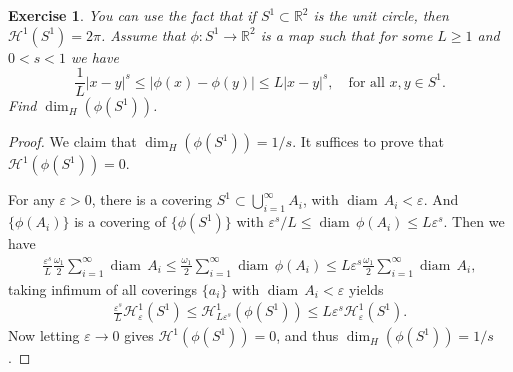 \documentclass[11pt]{book}
\newtheorem{exercise}{Exercise}[section]
\theoremstyle{definition}
\numberwithin{equation}{chapter}
\def\H{{\mathcal H}}
\def\diam{{\operatorname{diam}\,}}
\begin{document}
\begin{exercise}
You can use the fact that if $S^1\subset\mathbb{R}^2$ is the unit circle, then $\H^1(S^1)=2\pi$.
Assume that $\phi:S^1\to\mathbb{R}^2$ is a map such that for some $L\geq 1$ and $0<s<1$ we have
$$
\frac{1}{L}\left|x-y\right|^s\leq \left|\phi(x)-\phi(y)\right|\leq L\left|x-y\right|^s,
\quad
\text{for all $x,y\in S^1$.}
$$
Find $\dim_{H}(\phi(S^1))$.
\end{exercise}
\begin{proof}
We claim that $\dim_{H}(\phi(S^1)) = 1/s$. It suffices to prove that $\H^1(\phi(S^1)) = 0$.

For any $\varepsilon > 0$, there is a covering $S^1 \subset \bigcup^\infty_{i=1} A_i$, with $\diam A_i < \varepsilon$. And $\{\phi(A_i)\}$ is a covering of $\{\phi(S^1)\}$ with $\varepsilon^s/L \leq \diam \phi(A_i) \leq L \varepsilon^s$. Then we have
\begin{align*}
    \frac{\varepsilon^s}{L}\frac{\omega_1}{2} \sum^\infty_{i=1} \diam A_i \leq\frac{\omega_1}{2} \sum^\infty_{i=1} \diam \phi(A_i) \leq L \varepsilon^s \frac{\omega_1}{2} \sum^\infty_{i=1} \diam A_i,
\end{align*}
taking infimum of all coverings $\{a_i\}$ with $\diam A_i < \varepsilon$ yields
\begin{align*}
    \frac{\varepsilon^s}{L} \H^1_{\varepsilon}(S^1) \leq \H^1_{L\varepsilon^s}(\phi(S^1)) \leq L \varepsilon^s \H^1_{\varepsilon}(S^1).
\end{align*}
Now letting $\varepsilon \to 0$ gives $\H^1(\phi(S^1)) = 0$, and thus $\dim_{H}(\phi(S^1)) = 1/s$.
\end{proof}

\medskip
\end{document}

